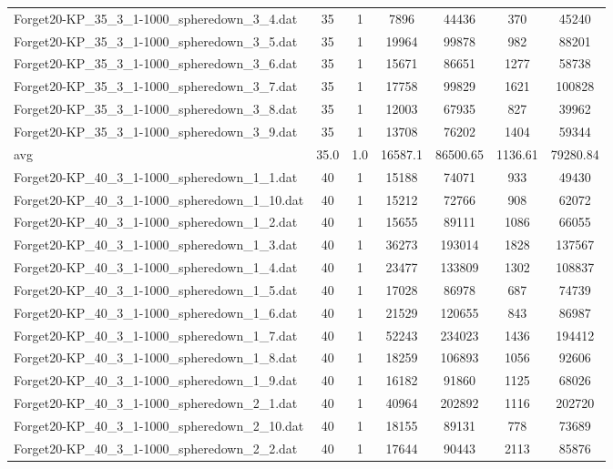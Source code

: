 \begin{table}[!ht]
\begin{tabular}{lcccccc}
Forget20-KP\_35\_3\_1-1000\_spheredown\_3\_4.dat & 35 & 1 & 7896 & 44436 & 370 & 45240 \\
Forget20-KP\_35\_3\_1-1000\_spheredown\_3\_5.dat & 35 & 1 & 19964 & 99878 & 982 & 88201 \\
Forget20-KP\_35\_3\_1-1000\_spheredown\_3\_6.dat & 35 & 1 & 15671 & 86651 & 1277 & 58738 \\
Forget20-KP\_35\_3\_1-1000\_spheredown\_3\_7.dat & 35 & 1 & 17758 & 99829 & 1621 & 100828 \\
Forget20-KP\_35\_3\_1-1000\_spheredown\_3\_8.dat & 35 & 1 & 12003 & 67935 & 827 & 39962 \\
Forget20-KP\_35\_3\_1-1000\_spheredown\_3\_9.dat & 35 & 1 & 13708 & 76202 & 1404 & 59344 \\
\cline{1-9} avg & 35.0 & 1.0 & 16587.1& 86500.65 & 1136.61& 79280.84\\ \hline
Forget20-KP\_40\_3\_1-1000\_spheredown\_1\_1.dat & 40 & 1 & 15188 & 74071 & 933 & 49430 \\
Forget20-KP\_40\_3\_1-1000\_spheredown\_1\_10.dat & 40 & 1 & 15212 & 72766 & 908 & 62072 \\
Forget20-KP\_40\_3\_1-1000\_spheredown\_1\_2.dat & 40 & 1 & 15655 & 89111 & 1086 & 66055 \\
Forget20-KP\_40\_3\_1-1000\_spheredown\_1\_3.dat & 40 & 1 & 36273 & 193014 & 1828 & 137567 \\
Forget20-KP\_40\_3\_1-1000\_spheredown\_1\_4.dat & 40 & 1 & 23477 & 133809 & 1302 & 108837 \\
Forget20-KP\_40\_3\_1-1000\_spheredown\_1\_5.dat & 40 & 1 & 17028 & 86978 & 687 & 74739 \\
Forget20-KP\_40\_3\_1-1000\_spheredown\_1\_6.dat & 40 & 1 & 21529 & 120655 & 843 & 86987 \\
Forget20-KP\_40\_3\_1-1000\_spheredown\_1\_7.dat & 40 & 1 & 52243 & 234023 & 1436 & 194412 \\
Forget20-KP\_40\_3\_1-1000\_spheredown\_1\_8.dat & 40 & 1 & 18259 & 106893 & 1056 & 92606 \\
Forget20-KP\_40\_3\_1-1000\_spheredown\_1\_9.dat & 40 & 1 & 16182 & 91860 & 1125 & 68026 \\
Forget20-KP\_40\_3\_1-1000\_spheredown\_2\_1.dat & 40 & 1 & 40964 & 202892 & 1116 & 202720 \\
Forget20-KP\_40\_3\_1-1000\_spheredown\_2\_10.dat & 40 & 1 & 18155 & 89131 & 778 & 73689 \\
Forget20-KP\_40\_3\_1-1000\_spheredown\_2\_2.dat & 40 & 1 & 17644 & 90443 & 2113 & 85876 \\

\end{tabular}
\end{table}
